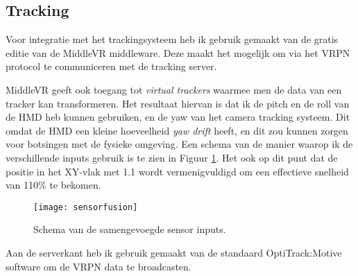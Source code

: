 \subsection{Tracking}
Voor integratie met het trackingsysteem heb ik gebruik gemaakt van de gratis
editie van de MiddleVR middleware\cite{middlevr}. Deze maakt het mogelijk om via 
het VRPN protocol te communiceren met de tracking server.

MiddleVR geeft ook toegang tot \emph{virtual trackers} waarmee men de data van 
een tracker kan transformeren. Het resultaat hiervan is dat ik de pitch en de 
roll van de HMD heb kunnen gebruiken, en de yaw van het camera tracking systeem. 
Dit omdat de HMD een kleine hoeveelheid \emph{yaw drift} heeft, en dit zou kunnen 
zorgen voor botsingen met de fysieke omgeving. Een schema van de manier waarop ik
de verschillende inputs gebruik is te zien in Figuur \ref{fig:sensorfusion}. Het
ook op dit punt dat de positie in het XY-vlak met 1.1 wordt vermenigvuldigd om
een effectieve snelheid van 110\% te bekomen.

\begin{figure}[t!]
    \centering
    \texttt{[image: sensorfusion]}
    \caption{Schema van de samengevoegde sensor inputs.}
    \label{fig:sensorfusion}
\end{figure}

Aan de serverkant heb ik gebruik gemaakt van de standaard OptiTrack:Motive 
software om de VRPN data te broadcasten.
